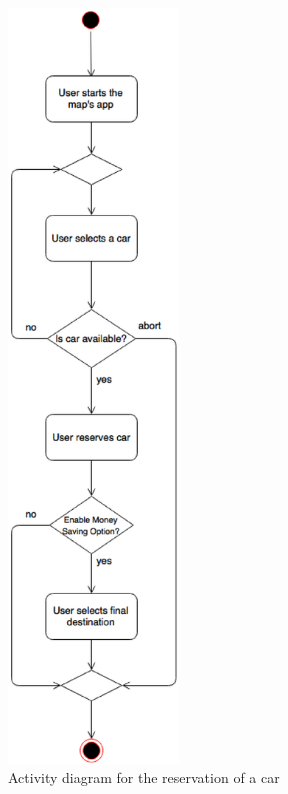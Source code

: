 \newpage
\begin{figure}[h]
	\centering
	\includegraphics[height=20cm,keepaspectratio]{figures/reservation_activity_diagram.eps}
	\caption{Activity diagram for the reservation of a car}
	\label{fig:reservation_activity_diagram}
\end{figure}
